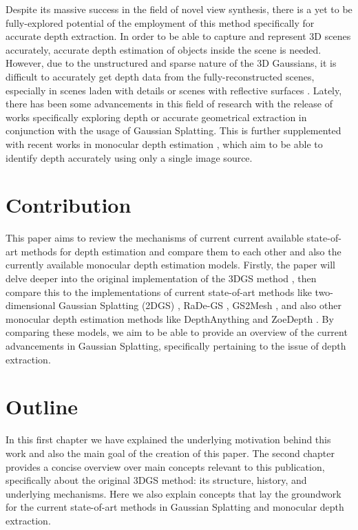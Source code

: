 Despite its massive success in the field of novel view synthesis, there is a yet to be fully-explored potential of the employment of this method specifically for accurate depth extraction. In order to be able to capture and represent 3D scenes accurately, accurate depth estimation of objects inside the scene is needed. However, due to the unstructured and sparse nature of the 3D Gaussians, it is difficult to accurately get depth data from the fully-reconstructed scenes, especially in scenes laden with details or scenes with reflective surfaces \parencite{depthsplat}. Lately, there has been some advancements in this field of research with the release of works specifically exploring depth or accurate geometrical extraction \parencite{radegs} \parencite{depth3DGS} \parencite{2DGS} \parencite{gs2mesh} in conjunction with the usage of Gaussian Splatting. This is further supplemented with recent works in monocular depth estimation \parencite{ZoeDepth} \parencite{DepthAnythingV1} \parencite{DepthAnythingV2}, which aim to be able to identify depth accurately using only a single image source.

\section{Contribution}

This paper aims to review the mechanisms of current current available state-of-art methods for depth estimation and compare them to each other and also the currently available monocular depth estimation models. Firstly, the paper will delve deeper into the original implementation of the 3DGS method \parencite{3DGS}, then compare this to the implementations of current state-of-art methods like two-dimensional Gaussian Splatting (2DGS) \parencite{2DGS}, RaDe-GS \parencite{radegs}, GS2Mesh \parencite{gs2mesh}, and also other monocular depth estimation methods like DepthAnything \parencite{DepthAnythingV1} \parencite{DepthAnythingV2} and ZoeDepth \parencite{ZoeDepth}. By comparing these models, we aim to be able to provide an overview of the current advancements in Gaussian Splatting, specifically pertaining to the issue of depth extraction.

\section{Outline}

In this first chapter we have explained the underlying motivation behind this work and also the main goal of the creation of this paper. The second chapter provides a concise overview over main concepts relevant to this publication, specifically about the original 3DGS method: its structure, history, and underlying mechanisms. Here we also explain concepts that lay the groundwork for the current state-of-art methods in Gaussian Splatting and monocular depth extraction.

